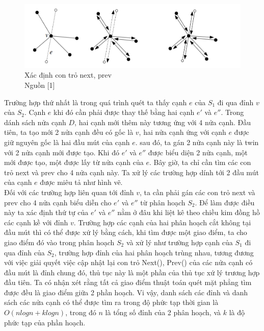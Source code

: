 \documentclass[15pt]{article}
\begin{document}
{\begin{figure}[h!]
\centering
\includegraphics[scale=0.5]{./vertex_from_subdivisions.png}
\caption{Xác định con trỏ next, prev \\ Nguồn [1]}
\label{fig: giao hai phân hoạch}
\end{figure}
Trường hợp thứ nhất là trong quá trình quét ta thấy cạnh $e$ của $S_1$ đi qua đỉnh $v$ của $S_2$. Cạnh $e$ khi đó cần phải được thay thế bằng hai cạnh $e'$ và $e''$. Trong dánh sách nửa cạnh $D$, hai cạnh mới thêm này tương ứng với 4 nửa cạnh. Đầu tiên, ta tạo mới 2 nửa cạnh đều có gốc là $v$, hai nửa cạnh ứng với cạnh $e$ được giữ nguyên gốc là hai đầu mút của cạnh $e$. sau đó, ta gán 2 nửa cạnh này là twin với 2 nửa cạnh mới được tạo. Khi đó $e'$ và $e''$ được biểu diện 2 nửa cạnh, một mới được tạo, một được lấy từ nửa cạnh của $e$. Bây giờ, ta chỉ cần tìm các con trỏ next và prev cho 4 nửa cạnh này. Ta xử lý các trường hợp dính tới 2 đầu mút của cạnh $e$ được miêu tả như hình vẽ. \\

Đối với các trường hợp liên quan tới đỉnh $v$, ta cần phải gán các con trỏ next và prev cho 4 nửa cạnh biểu diễn cho $e'$ và $e''$ từ phân hoạch $S_2$. Để làm được điều này ta xác định thứ tự của $e'$ và $e''$ nằm ở đâu khi liệt kê theo chiều kim đồng hồ các cạnh kề với đỉnh $v$. Trường hợp các cạnh của hai phân hoạch cắt không tại đầu mút thì có thể được xứ lý bằng cách, khi tìm được một giao điểm, ta cho giao điểm đó vào trong phân hoạch $S_2$ và xử lý như trường hợp cạnh của $S_1$ đi qua đỉnh của $S_2$, trường hợp đỉnh của hai phân hoạch trùng nhau, tương đương với việc giải quyết việc cập nhật lại con trỏ Next(), Prev() của các nửa cạnh có đầu mút là đỉnh chung đó, thủ tục này là một phần của thủ tục xứ lý trương hợp đầu tiên. Ta có nhận xét rằng tất cả giao điểm thuật toán quét mặt phẳng tìm được đều là giao điểm giữa 2 phần hoạch. Vi vậy, danh sách các đỉnh và danh sách các nửa cạnh có thể được tìm ra trong độ phức tạp thời gian là $O(n log n + k log n)$, trong đó $n$ là tổng số đỉnh của 2 phân hoạch, và $k$ là  độ phức tạp của phần hoạch. \\

}
\end{document}
